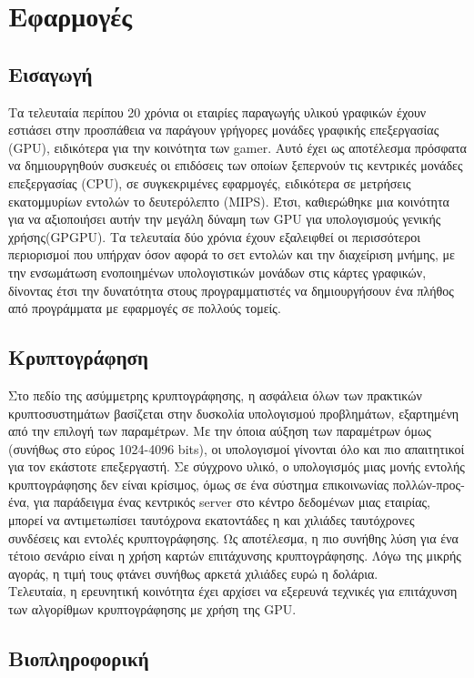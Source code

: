 \chapter{Εφαρμογές}
\section{Εισαγωγή}
Τα τελευταία περίπου 20 χρόνια οι εταιρίες παραγωγής υλικού γραφικών έχουν εστιάσει στην προσπάθεια να παράγουν γρήγορες μονάδες γραφικής επεξεργασίας (GPU), ειδικότερα για την κοινότητα των gamer. Αυτό έχει ως αποτέλεσμα πρόσφατα να δημιουργηθούν συσκευές οι επιδόσεις των οποίων ξεπερνούν τις κεντρικές μονάδες επεξεργασίας (CPU), σε συγκεκριμένες εφαρμογές, ειδικότερα σε μετρήσεις εκατομμυρίων εντολών το δευτερόλεπτο (MIPS). Έτσι, καθιερώθηκε μια κοινότητα για να αξιοποιήσει αυτήν την μεγάλη δύναμη των GPU για υπολογισμούς γενικής χρήσης(GPGPU). Τα τελευταία δύο χρόνια έχουν εξαλειφθεί οι περισσότεροι περιορισμοί που υπήρχαν όσον αφορά το σετ εντολών και την διαχείριση μνήμης, με την ενσωμάτωση ενοποιημένων υπολογιστικών μονάδων στις κάρτες γραφικών, δίνοντας έτσι την δυνατότητα στους προγραμματιστές να δημιουργήσουν ένα πλήθος από προγράμματα με εφαρμογές σε πολλούς τομείς.
\section{Κρυπτογράφηση}
Στο πεδίο της ασύμμετρης κρυπτογράφησης, η ασφάλεια όλων των πρακτικών κρυπτοσυστημάτων βασίζεται στην δυσκολία υπολογισμού προβλημάτων, εξαρτημένη από την επιλογή των παραμέτρων. Με την όποια αύξηση των παραμέτρων όμως (συνήθως στο εύρος 1024-4096 bits), οι υπολογισμοί γίνονται όλο και πιο απαιτητικοί για τον εκάστοτε επεξεργαστή. Σε σύγχρονο υλικό, ο υπολογισμός μιας μονής εντολής κρυπτογράφησης δεν είναι κρίσιμος, όμως σε ένα σύστημα επικοινωνίας πολλών-προς-ένα, για παράδειγμα ένας κεντρικός server στο κέντρο δεδομένων μιας εταιρίας, μπορεί να αντιμετωπίσει ταυτόχρονα εκατοντάδες η και χιλιάδες ταυτόχρονες συνδέσεις και εντολές κρυπτογράφησης. Ως αποτέλεσμα, η πιο συνήθης λύση για ένα τέτοιο σενάριο είναι η χρήση καρτών επιτάχυνσης κρυπτογράφησης. Λόγω της μικρής αγοράς, η τιμή τους φτάνει συνήθως αρκετά χιλιάδες ευρώ η δολάρια.\\
Τελευταία, η ερευνητική κοινότητα έχει αρχίσει να εξερευνά τεχνικές για επιτάχυνση των αλγορίθμων κρυπτογράφησης με χρήση της GPU.  

\section{Βιοπληροφορική}
